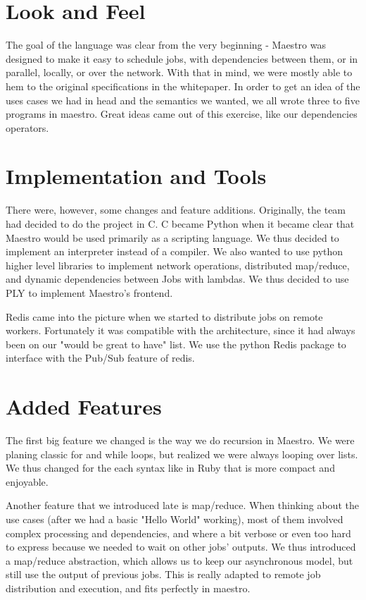 \section{Look and Feel}
The goal of the language was clear from the very beginning - Maestro was designed to make it easy to schedule jobs, with dependencies between them, or in parallel, locally, or over the network.
With that in mind, we were mostly able to hem to the original specifications in the whitepaper.
In order to get an idea of the uses cases we had in head and the semantics we wanted, we all wrote three to five programs in maestro.
Great ideas came out of this exercise, like our dependencies operators.

\section{Implementation and  Tools}
There were, however, some changes and feature additions. Originally, the team had decided to do the project in C. C became Python when it became clear that Maestro would be used primarily as a scripting language. We thus decided to implement an interpreter instead of a compiler.
We also wanted to use python higher level libraries to implement network operations, distributed map/reduce, and dynamic dependencies between Jobs with lambdas.
We thus decided to use PLY to implement Maestro's frontend.

Redis came into the picture when we started to distribute jobs on remote workers.
Fortunately it was compatible with the architecture, since it had always been on our "would be great to have" list.
We use the python Redis package to interface with the Pub/Sub feature of redis.

\section{Added Features}
The first big feature we changed is the way we do recursion in Maestro. We were planing classic for and while loops, but realized we were always looping over lists.
We thus changed for the each syntax like in Ruby that is more compact and enjoyable.

Another feature that we introduced late is map/reduce. When thinking about the use cases (after we had a basic "Hello World" working), most of them involved complex processing and dependencies, and where a bit verbose or even too hard to express because we needed to wait on other jobs' outputs.
We thus introduced a map/reduce abstraction, which allows us to keep our asynchronous model, but still use the output of previous jobs.
This is really adapted to remote job distribution and execution, and fits perfectly in maestro.

